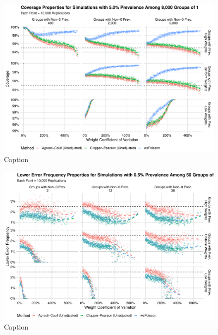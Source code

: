 \documentclass[AMA,STIX1COL]{WileyNJD-v2}
\begin{document}
\begin{figure}
    \centering
    \includegraphics[width=\textwidth]{figures/perfect_coverage_8000_0_05_reduced.pdf}
    \caption{Caption}
    \label{fig:perfect_coverage_8000_0_05_reduced.pdf}
\end{figure}


\begin{figure}
    \centering
    \includegraphics[width=\textwidth]{figures/perfect_lower_error_frequency_50_0_005_reduced.pdf}
    \caption{Caption}
    \label{fig:perfect_lower_error_frequency_50_0_005_reduced}
\end{figure}
\end{document}
